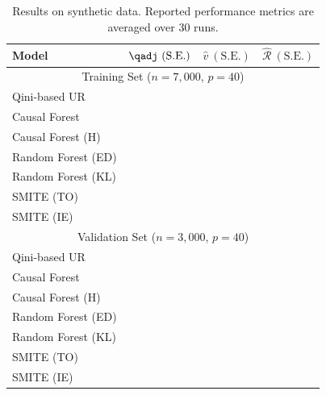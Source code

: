 \begin{table}[H]
     \caption{Results on synthetic data. Reported performance metrics are averaged over $30$ runs. }
    \centering
    \begin{tabular}{|p{3.3cm}||p{2.1cm}|p{1.8cm}|p{1.8cm}|}
         \hline
         Model &  $\qadj~(\mathrm{S.E.})$ & $\hat{v}~(\mathrm{S.E.})$ & $\hat{\mathcal{R}}~(\mathrm{S.E.})$\\
         \hline
         \multicolumn{4}{|c|}{Training Set ($n=7,000$, $p=40$)} \\
         \hline
         Qini-based UR  &  & & \\
         Causal Forest  &  & & \\
         Causal Forest (H) &  & & \\
         Random Forest (ED) &  & & \\
         Random Forest (KL) &  & & \\
         SMITE (TO) &  & & \\
         SMITE (IE) &  & & \\
         \hline
         \multicolumn{4}{|c|}{Validation Set ($n=3,000$, $p=40$)} \\
         \hline
         Qini-based UR  &  & & \\
         Causal Forest  &  & & \\
         Causal Forest (H) &  & & \\
         Random Forest (ED) &  & & \\
         Random Forest (KL) &  & & \\
         SMITE (TO) &  & & \\
         SMITE (IE) &  & & \\
         \hline
    \end{tabular}
    \label{tab:synthe_perf}
\end{table}